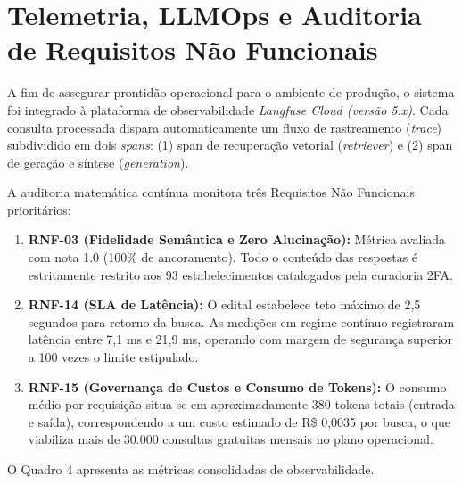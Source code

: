\documentclass[12pt,a4paper]{article}
\begin{document}
\section{Telemetria, LLMOps e Auditoria de Requisitos Não Funcionais}

A fim de assegurar prontidão operacional para o ambiente de produção, o sistema foi integrado à plataforma de observabilidade \textit{Langfuse Cloud (versão 5.x)}. Cada consulta processada dispara automaticamente um fluxo de rastreamento (\textit{trace}) subdividido em dois \textit{spans}: (1) span de recuperação vetorial (\textit{retriever}) e (2) span de geração e síntese (\textit{generation}).

A auditoria matemática contínua monitora três Requisitos Não Funcionais prioritários:

\begin{enumerate}
\item \textbf{RNF-03 (Fidelidade Semântica e Zero Alucinação):} Métrica avaliada com nota 1.0 (100\% de ancoramento). Todo o conteúdo das respostas é estritamente restrito aos 93 estabelecimentos catalogados pela curadoria 2FA.
\item \textbf{RNF-14 (SLA de Latência):} O edital estabelece teto máximo de 2,5 segundos para retorno da busca. As medições em regime contínuo registraram latência entre 7,1 ms e 21,9 ms, operando com margem de segurança superior a 100 vezes o limite estipulado.
\item \textbf{RNF-15 (Governança de Custos e Consumo de Tokens):} O consumo médio por requisição situa-se em aproximadamente 380 tokens totais (entrada e saída), correspondendo a um custo estimado de R\$ 0,0035 por busca, o que viabiliza mais de 30.000 consultas gratuitas mensais no plano operacional.
\end{enumerate}

O Quadro 4 apresenta as métricas consolidadas de observabilidade.
\end{document}

